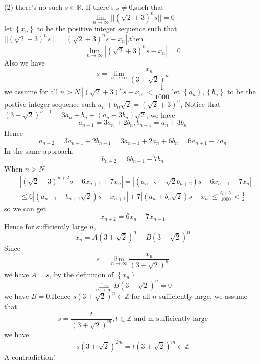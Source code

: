 \documentclass[a4paper,12pt]{article}
\newenvironment{prooff}{{\noindent\it\textcolor{cyan!40!black}{Proof}:}\quad}{\par}
\newcommand{\bbrace}[1]{\left\{ #1 \right\} }
\newcommand{\bb}[1]{\mathbb{#1}}
\begin{document}
\begin{prooff}
    (2) there's no such $s\in \bb{R}$. If there's $s\neq 0$,such that
    \begin{equation*}
        \lim_{n\to \infty}||(\sqrt{2}+3)^n s||=0
    \end{equation*}
    let $\bbrace{x_n}$ to be the positive integer sequence such that $||(\sqrt{2}+3)^n s||=|(\sqrt{2}+3)^n s-x_n|$,then
    \begin{equation*}
        \lim_{n\to \infty}|(\sqrt{2}+3)^n s-x_n|=0
    \end{equation*}
    Also we have
    \begin{equation*}
        s=\lim_{n\to \infty}\frac{x_n}{(3+\sqrt{2})^n}
    \end{equation*}
    we assume for all $n>N$,$|(\sqrt{2}+3)^n s-x_n|<\dfrac{1}{1000}$
    let $\bbrace{a_n},\bbrace{b_n}$ to be the postive integer sequence such $a_n+b_n\sqrt{2}=(\sqrt{2}+3)^n$,
    Notice that $(3+\sqrt{2})^{n+1}=3a_n+b_n+(a_n+3b_n)\sqrt{2}$, we have
    \begin{equation*}
        a_{n+1}=3a_n+2b_n,b_{n+1}=a_n+3b_n
    \end{equation*}
    Hence
    \begin{equation*}
        a_{n+2}=3a_{n+1}+2b_{n+1}=3a_{n+1}+2a_n+6b_n=6a_{n+1}-7a_n
    \end{equation*}
    In the same approach,
    \begin{equation*}
        b_{n+2}=6b_{n+1}-7b_n
    \end{equation*}
    When $n>N$
    \begin{align*}
         & |(\sqrt{2}+3)^{n+2} s-6x_{n+1}+7x_{n}|=|(a_{n+2}+\sqrt{2}b_{n+2})s-6x_{n+1}+7x_{n}|                       \\
         & \le 6|(a_{n+1}+b_{n+1}\sqrt{2})s-x_{n+1}|+7|(a_{n}+b_{n}\sqrt{2})s-x_{n}|\le \frac{6+7}{1000}<\frac{1}{2}
    \end{align*}
    so we can get
    \begin{equation*}
        x_{n+2}=6x_n-7x_{n-1}
    \end{equation*}
    Hence for sufficiently large $n$,
    \begin{equation*}
        x_n=A(3+\sqrt{2})^n+B(3-\sqrt{2})^n
    \end{equation*}
    Since
    \begin{equation*}
        s=\lim_{n\to \infty}\frac{x_n}{(3+\sqrt{2})^n}
    \end{equation*}
    we have $A=s$, by the definition of $\bbrace{x_n}$
    \begin{equation*}
        \lim_{n\to \infty}B(3-\sqrt{2})^n=0
    \end{equation*}
    we have $B=0$.Hence $s(3+\sqrt{2})^n\in \bb{Z}$ for all $n$ sufficiently large, we assume that
    \begin{equation*}
        s=\frac{t}{(3+\sqrt{2})^m}, t\in \bb{Z} \text{ and m sufficiently large}
    \end{equation*}
    we have
    \begin{equation*}
        s(3+\sqrt{2})^{2m}=t(3+\sqrt{2})^{m}\in \bb{Z}
    \end{equation*}
    A contradiction!


\end{prooff}
\end{document}
